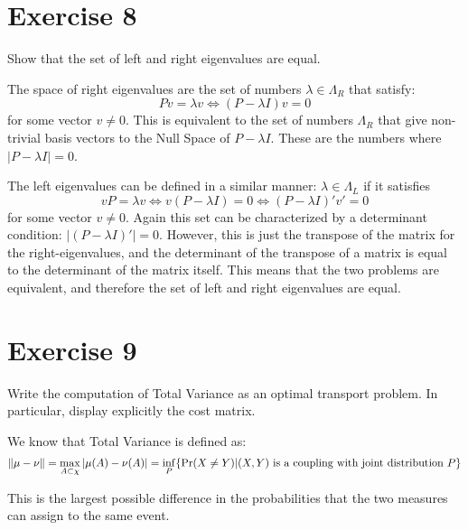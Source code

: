 \documentclass[12pt]{paper}
\newcommand{\abs}[1]{\left \lvert #1 \right \rvert}
\DeclarePairedDelimiter{\norm}{\lVert}{\rVert}
\begin{document}
\section{Exercise 8}

Show that the set of left and right eigenvalues are equal.

\vspace{.3in}

The space of right eigenvalues are the set of numbers $\lambda \in \Lambda_R$ that
satisfy:
\begin{equation*}
  Pv = \lambda v \Leftrightarrow ( P - \lambda I)v = 0
\end{equation*}
for some vector $v \neq 0$. This is equivalent to the set of numbers $\Lambda_R$
that give non-trivial basis vectors to the Null Space of $P - \lambda
I$. These are the numbers where $\abs{P - \lambda I} = 0$.

The left eigenvalues can be defined in a similar manner: $\lambda \in \Lambda_L$ if
it satisfies
\begin{equation*}
  vP = \lambda v \Leftrightarrow v(P -\lambda I) = 0 \Leftrightarrow (P - \lambda I)' v' = 0
\end{equation*}
for some vector $v \neq 0$. Again this set can be characterized by a
determinant condition: $\abs{(P - \lambda I)'} = 0$. However, this is just
the transpose of the matrix for the right-eigenvalues, and the
determinant of the transpose of a matrix is equal to the determinant
of the matrix itself. This means that the two problems are equivalent,
and therefore the set of left and right eigenvalues are equal.

\section{Exercise 9}

Write the computation of Total Variance as an optimal transport
problem. In particular, display explicitly the cost matrix.

\vspace{.3in}

We know that Total Variance is defined as:
\begin{equation*}
  \norm{\mu - \nu} = \max_{A \subset \chi} \abs{\mu(A) - \nu(A)} = \inf_P \{ \Pr( X \neq Y )
  \vert (X,Y) \text{ is a coupling with joint distribution }P\}
\end{equation*}

This is the largest possible difference in the probabilities that the
two measures can assign to the same event.
\end{document}
